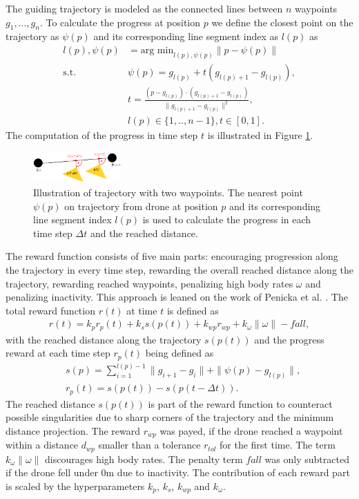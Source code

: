 The guiding trajectory is modeled as the connected lines between $n$ waypoints $g_1,...,g_n$. To calculate the progress at position $p$ we define the closest point on the trajectory as $\psi(p)$ and its corresponding line segment index as $l(p)$ as 
\begin{align}
\label{equ:progress_computation}
    l(p),\psi(p) &= \text{arg min}_{l(p),\psi(p)} \|p - \psi(p)\| \\
    \text{s.t. } & \psi(p) = g_{l(p)} + t (g_{l(p)+1} -  g_{l(p)}), \nonumber \\
     &t = \frac{(p - g_{l(p)}) \cdot (g_{l(p)+1} -  g_{l(p)})}{\|g_{l(p)+1} -  g_{l(p)}\|^2} , \nonumber \\
     &l(p) \in \{1,..,n-1\}, t \in [0,1]. \nonumber
\end{align}
The computation of the progress in time step $t$ is illustrated in Figure \ref{fig:trajectory}. 

\begin{figure}[b]
    \centering
    \includegraphics[width=0.3\textwidth]{images/trajectory.png}
    \caption{Illustration of trajectory with two waypoints. The nearest point $\psi(p)$ on trajectory from drone at position $p$ and its corresponding line segment index $l(p)$ is used to calculate the progress in each time step $\Delta t$ and the reached distance.}
    \label{fig:trajectory}
\end{figure}

The reward function consists of five main parts: encouraging progression along the trajectory in every time step, rewarding the overall reached distance along the trajectory, rewarding reached waypoints, penalizing high body rates $\omega$ and penalizing inactivity. This approach is leaned on the work of Penicka et al. \cite{Penicka_2022}.
The total reward function $r(t)$ at time $t$ is defined as 
\begin{align}
\label{equ:reward}
r(t) = k_p r_p(t) + k_s s(p(t)) + k_{wp} r_{wp} + k_\omega \|\omega\| - fall,
\end{align}
with the reached distance along the trajectory $s(p(t))$ and the progress reward at each time step $r_p(t)$ being defined as
\begin{align}
    &s(p) = \sum_{i=1}^{l(p) - 1} \| g_{i+1} - g_i \| + \|\psi(p) - g_{l(p)}\|, \\
    &r_p(t) = s(p(t))-s(p(t- \Delta t)).
\end{align}
The reached distance $s(p(t))$ is part of the reward function to counteract possible singularities due to sharp corners of the trajectory and the minimum distance projection. The reward $r_{wp}$ was payed, if the drone reached a waypoint within a distance $d_{wp}$ smaller than a tolerance $r_{tol}$ for the first time. The term $k_\omega \|\omega\|$ discourages high body rates. The penalty term $fall$ was only subtracted if the drone fell under $0$m due to inactivity. The contribution of each reward part is scaled by the hyperparameters $k_p$, $k_s$, $k_{wp}$ and $k_{\omega}$.